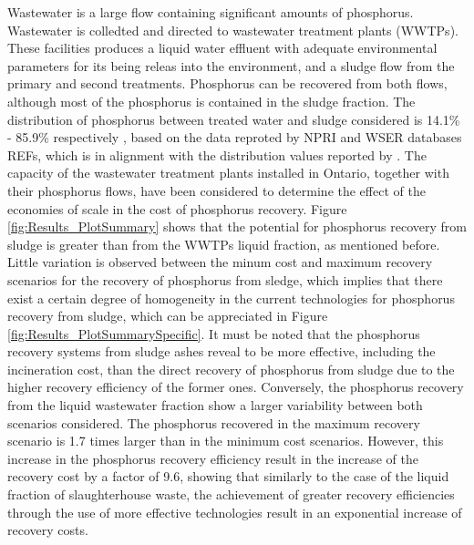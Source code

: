 \documentclass[authoryear]{elsarticle}
\begin{document}
Wastewater is a large flow containing significant amounts of phosphorus. Wastewater is colledted and directed to wastewater treatment plants (WWTPs). These facilities produces a liquid water effluent with adequate environmental parameters for its being releas into the environment, and a sludge flow from the primary and second treatments. Phosphorus can be recovered from both flows, although most of the phosphorus is contained in the sludge fraction.
The distribution of phosphorus between treated water and sludge considered is 14.1\% - 85.9\% respectively \citep{PFlows_Ontario}, based on the data reproted by NPRI and WSER databases REFs, which is in alignment with the distribution values reported by \citep{egle_phosphorus_2016}. The capacity of the wastewater treatment plants installed in Ontario, together with their phosphorus flows, have been considered to determine the effect of the economies of scale in the cost of phosphorus recovery.
Figure \ref{fig:Results_PlotSummary} shows that the potential for phosphorus recovery from sludge is greater than from the WWTPs liquid fraction, as mentioned before. Little variation is observed between the minum cost and maximum recovery scenarios for the recovery of phosphorus from sledge, which implies that there exist a certain degree of homogeneity in the current technologies for phosphorus recovery from sludge, which can be appreciated in Figure \ref{fig:Results_PlotSummarySpecific}. It must be noted that the phosphorus recovery systems from sludge ashes reveal to be more effective, including the incineration cost, than the direct recovery of phosphorus from sludge due to the higher recovery efficiency of the former ones. Conversely, the phosphorus recovery from the liquid wastewater fraction show a larger variability between both scenarios considered. The phosphorus recovered in the maximum recovery scenario is 1.7 times larger than in the minimum cost scenarios. However, this increase in the phosphorus recovery efficiency result in the increase of the recovery cost by a factor of 9.6, showing that similarly to the case of the liquid fraction of slaughterhouse waste, the achievement of greater recovery efficiencies through the use of more effective technologies result in an exponential increase of recovery costs.
\end{document}
